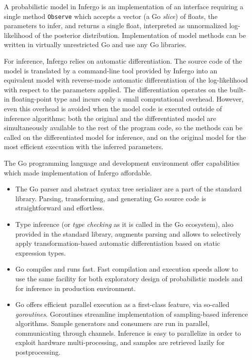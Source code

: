 \documentclass[sigplan,review,10pt,anonymous]{acmart}
\begin{document}
\begin{sloppypar}
A probabilistic model in Infergo is an implementation of an
interface requiring a single method \texttt{Observe} which
accepts a vector (a Go \textit{slice}) of floats, the parameters
to infer, and returns a single float, interpreted as
unnormalized log-likelihood of the posterior distribution.
Implementation of model methods can be written in virtually
unrestricted Go and use any Go libraries.

For inference, Infergo relies on automatic differentiation. The
source code of the model is translated by a command-line tool
provided by Infergo into an equivalent model with reverse-mode
automatic differentiation of the log-likelihood with respect to
the parameters applied. The differentiation operates on the
built-in floating-point type and incurs only a small
computational overhead. However, even this overhead is avoided
when the model code is executed outside of inference algorithms:
both the original and the differentiated model are
simultaneously available to the rest of the program code, so the
methods can be called on the differentiated model for inference,
and on the original model for the most efficient execution with
the inferred parameters.

The Go programming language and development environment offer
capabilities which made implementation of Infergo affordable.

\begin{itemize}
\item The Go parser and abstract syntax tree serializer are
	a part of the standard library. Parsing, transforming,
	and generating Go source code is straightforward and
	effortless.
\item Type inference (or \textit{type checking} as it is
	called in the Go ecosystem), also provided in the
	standard library, augments parsing and allows to
	selectively apply transformation-based automatic
	differentiation  based on static expression types. 
\item Go compiles and runs fast. Fast compilation and
	execution speeds allow to use the same facility for both
	exploratory design of probabilistic models and for
	inference in production environment.
\item Go offers efficient parallel execution as a
	first-class feature, via so-called \textit{goroutines}.
	Goroutines streamline implementation of sampling-based
	inference algorithms. Sample generators and consumers
	are run in parallel, communicating through channels. 
	Inference is easy to parallelize in order to exploit
	hardware multi-processing, and samples are retrieved
	lazily for postprocessing. 
\end{itemize}


\end{sloppypar}
\end{document}
